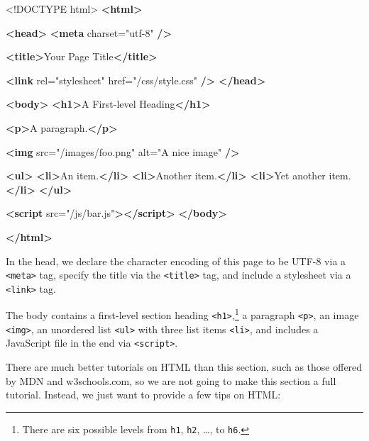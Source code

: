 \documentclass[12pt,]{krantz}
\makeatletter
\newenvironment{Shaded}{\begin{snugshade}}{\end{snugshade}}
\newcommand{\DataTypeTok}[1]{\textcolor[rgb]{0.13,0.29,0.53}{#1}}
\newcommand{\KeywordTok}[1]{\textcolor[rgb]{0.13,0.29,0.53}{\textbf{#1}}}
\newcommand{\NormalTok}[1]{#1}
\newcommand{\OtherTok}[1]{\textcolor[rgb]{0.56,0.35,0.01}{#1}}
\newcommand{\StringTok}[1]{\textcolor[rgb]{0.31,0.60,0.02}{#1}}
\newenvironment{kframe}{%
\medskip{}
\setlength{\fboxsep}{.8em}
 \def\at@end@of@kframe{}%
 \ifinner\ifhmode%
  \def\at@end@of@kframe{\end{minipage}}%
  \begin{minipage}{\columnwidth}%
 \fi\fi%
 \def\FrameCommand##1{\hskip\@totalleftmargin \hskip-\fboxsep
 \colorbox{shadecolor}{##1}\hskip-\fboxsep
     \hskip-\linewidth \hskip-\@totalleftmargin \hskip\columnwidth}%
 \MakeFramed {\advance\hsize-\width
   \@totalleftmargin\z@ \linewidth\hsize
   \@setminipage}}%
 {\par\unskip\endMakeFramed%
 \at@end@of@kframe}
\renewenvironment{Shaded}{\begin{kframe}}{\end{kframe}}
\theoremstyle{definition}
\theoremstyle{definition}
\theoremstyle{definition}
\theoremstyle{remark}
\makeatother
\begin{document}
\begin{Shaded}
\begin{Highlighting}[]
\DataTypeTok{<!DOCTYPE }\NormalTok{html}\DataTypeTok{>}
\KeywordTok{<html>}

  \KeywordTok{<head>}
    \KeywordTok{<meta}\OtherTok{ charset=}\StringTok{"utf-8"} \KeywordTok{/>}
    
    \KeywordTok{<title>}\NormalTok{Your Page Title}\KeywordTok{</title>}
    
    \KeywordTok{<link}\OtherTok{ rel=}\StringTok{"stylesheet"}\OtherTok{ href=}\StringTok{"/css/style.css"} \KeywordTok{/>}
  \KeywordTok{</head>}
  
  \KeywordTok{<body>}
    \KeywordTok{<h1>}\NormalTok{A First-level Heading}\KeywordTok{</h1>}
    
    \KeywordTok{<p>}\NormalTok{A paragraph.}\KeywordTok{</p>}
    
    \KeywordTok{<img}\OtherTok{ src=}\StringTok{"/images/foo.png"}\OtherTok{ alt=}\StringTok{"A nice image"} \KeywordTok{/>}
    
    \KeywordTok{<ul>}
      \KeywordTok{<li>}\NormalTok{An item.}\KeywordTok{</li>}
      \KeywordTok{<li>}\NormalTok{Another item.}\KeywordTok{</li>}
      \KeywordTok{<li>}\NormalTok{Yet another item.}\KeywordTok{</li>}
    \KeywordTok{</ul>}
    
    \KeywordTok{<script}\OtherTok{ src=}\StringTok{"/js/bar.js"}\KeywordTok{></script>}
  \KeywordTok{</body>}

\KeywordTok{</html>}
\end{Highlighting}
\end{Shaded}

In the head, we declare the character encoding of this page to be UTF-8
via a \texttt{\textless{}meta\textgreater{}} tag, specify the title via
the \texttt{\textless{}title\textgreater{}} tag, and include a
stylesheet via a \texttt{\textless{}link\textgreater{}} tag.

The body contains a first-level section heading
\texttt{\textless{}h1\textgreater{}},\footnote{There are six possible
  levels from \texttt{h1}, \texttt{h2}, \ldots{}, to \texttt{h6}.} a
paragraph \texttt{\textless{}p\textgreater{}}, an image
\texttt{\textless{}img\textgreater{}}, an unordered list
\texttt{\textless{}ul\textgreater{}} with three list items
\texttt{\textless{}li\textgreater{}}, and includes a JavaScript file in
the end via \texttt{\textless{}script\textgreater{}}.

There are much better tutorials on HTML than this section, such as those
offered by MDN and w3schools.com, so we are not going to make this
section a full tutorial. Instead, we just want to provide a few tips on
HTML:
\end{document}
